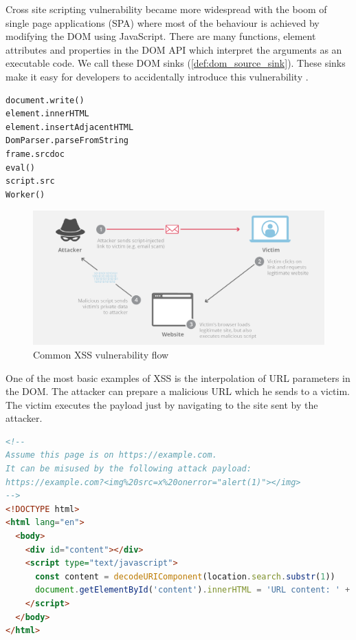 Cross site scripting vulnerability became more widespread with the boom of single page applications
(SPA) where most of the behaviour is achieved by modifying the DOM using JavaScript. There are many
functions, element attributes and properties in the DOM API which interpret the arguments as an
executable code. We call these DOM sinks (\ref{def:dom_source_sink}). These sinks make it easy for
developers to accidentally introduce this vulnerability \cite{tt_web_framework_paper}.

\bigskip
\begin{lstlisting}[language={}, caption=Examples of most common DOM XSS sinks \cite{dom_xss_portswigger} \cite{tt_web_framework_paper}]
document.write()
element.innerHTML
element.insertAdjacentHTML
DomParser.parseFromString
frame.srcdoc
eval()
script.src
Worker()
\end{lstlisting}

\begin{figure}[H]
  \centerline{\includegraphics[width=1\textwidth]{images/xss-attack.png}}
  \caption[Common XSS vulnerability flow \cite{xss_image}]{Common XSS vulnerability flow \cite{xss_image}}
  \label{img:xss}
\end{figure}

One of the most basic examples of XSS is the interpolation of URL parameters in the DOM. The
attacker can prepare a malicious URL which he sends to a victim. The victim executes the payload
just by navigating to the site sent by the attacker.

\bigskip
\begin{lstlisting}[language=HTML, caption=Basic example of XSS via unsafe URL parameter interpolation]
<!--
Assume this page is on https://example.com.
It can be misused by the following attack payload:
https://example.com?<img%20src=x%20onerror="alert(1)"></img>
-->
<!DOCTYPE html>
<html lang="en">
  <body>
    <div id="content"></div>
    <script type="text/javascript">
      const content = decodeURIComponent(location.search.substr(1))
      document.getElementById('content').innerHTML = 'URL content: ' + content
    </script>
  </body>
</html>
\end{lstlisting}

